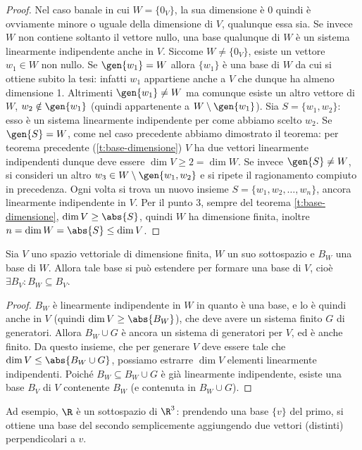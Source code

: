 \begin{proof}
	Nel caso banale in cui $W=\{0_V\}$, la sua dimensione è 0 quindi è ovviamente minore o uguale della dimensione di $V$, qualunque essa sia.
	Se invece $W$ non contiene soltanto il vettore nullo, una base qualunque di $W$ è un sistema linearmente indipendente anche in $V$.
	Siccome $W\neq\{0_V\}$, esiste un vettore $  w_1\in W$ non nullo.
	Se $\gen{  w_1}=W$ allora $\{  w_1\}$ è una base di $W$ da cui si ottiene subito la tesi: infatti $  w_1$ appartiene anche a $V$ che dunque ha almeno dimensione 1.
	Altrimenti $\gen{  w_1}\neq W$ ma comunque esiste un altro vettore di $W$, $  w_2\notin\gen{  w_1}$ (quindi appartenente a $W\setminus\gen{  w_1}$).
	Sia $S=\{  w_1,  w_2\}$: esso è un sistema linearmente indipendente per come abbiamo scelto $  w_2$.
	Se $\gen{S}=W$, come nel caso precedente abbiamo dimostrato il teorema: per teorema precedente (\ref{t:base-dimensione}) $V$ ha due vettori linearmente indipendenti dunque deve essere $\dim V\geq 2=\dim W$.
	Se invece $\gen{S}\neq W$, si consideri un altro $  w_3\in W\setminus\gen{  w_1,  w_2}$ e si ripete il ragionamento compiuto in precedenza.
	Ogni volta si trova un nuovo insieme $S=\{  w_1,  w_2,\dots,  w_n\}$, ancora linearmente indipendente in $V$.
	Per il punto 3, sempre del teorema \ref{t:base-dimensione}, $\dim V\geq\abs{S}$, quindi $W$ ha dimensione finita, inoltre $n=\dim W=\abs{S}\leq\dim V$.
\end{proof}

\begin{teorema}\label{estensione-base}
	Sia $V$ uno spazio vettoriale di dimensione finita, $W$ un suo sottospazio e $B_W$ una base di $W$.
	Allora tale base si può estendere per formare una base di $V$, cioè $\exists B_V\colon B_W\subseteq B_V$.
\end{teorema}
\begin{proof}
	$B_W$ è linearmente indipendente in $W$ in quanto è una base, e lo è quindi anche in $V$ (quindi $\dim V\geq\abs{B_W}$), che deve avere un sistema finito $G$ di generatori.
	Allora $B_W\cup G$ è ancora un sistema di generatori per $V$, ed è anche finito.
	Da questo insieme, che per generare $V$ deve essere tale che $\dim V\leq\abs{B_W\cup G}$, possiamo estrarre $\dim V$ elementi linearmente indipendenti.
	Poiché $B_W\subseteq B_W\cup G$ è già linearmente indipendente, esiste una base $B_V$ di $V$ contenente $B_W$ (e contenuta in $B_W\cup G$).
\end{proof}
Ad esempio, $\R$ è un sottospazio di $\R^3$: prendendo una base $\{  v\}$ del primo, si ottiene una base del secondo semplicemente aggiungendo due vettori (distinti) perpendicolari a $  v$.

